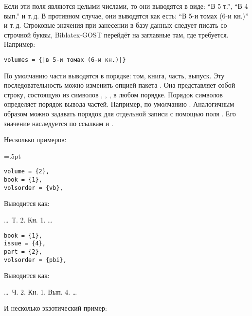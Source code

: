 \documentclass[10pt,a4paper,headings=small,numbers=enddot,english,russian]{ltxdockit}[2011/03/25]
\newcommand*{\biblatexgost}{Biblatex-GOST\xspace}
\newenvironment{bibexample}{\begin{list}
     {}
     {\setlength{\leftmargin}{\parindent}%
      \setlength{\itemindent}{-\leftmargin}%
      \setlength{\parsep}{0pt}}}
  {\end{list}}
\begin{document}
Если эти поля являются целыми числами, то они выводятся в виде: \enquote{В 5 т.},
\enquote{В 4 вып.} и т.\,д. В противном случае, они выводятся как есть: \enquote{В
5-и томах (6-и кн.)} и т.\,д. Строковые значения при занесении в базу данных следует
писать со строчной буквы, \biblatexgost перейдёт на заглавные там, где требуется. Например:

\begin{lstlisting}[style=bibtex,escapechar=|]
volumes = {|в 5-и томах (6-и кн.)|}
\end{lstlisting}

По умолчанию части выводятся в порядке: том, книга, часть, выпуск. Эту последовательность
можно изменить опцией пакета . Она представляет собой строку, состоящую из
символов , , ,  в любом порядке.   %
Порядок символов определяет порядок вывода частей. Например, по умолчанию .
Аналогичным образом можно задавать порядок для отдельной записи
с помощью поля . Его значение наследуется по ссылкам 
и .

Несколько примеров:

\columnseprule=.5pt
\raggedcolumns
\begin{multicols}{2}
\begin{lstlisting}[style=bibtex,escapechar=|]
volume = {2},
book = {1},
volsorder = {vb},
\end{lstlisting}
\columnbreak
Выводится как:
\begin{bibexample}
\item \ldots\ Т. 2. Кн. 1. \ldots
\end{bibexample}
\columnbreak
\end{multicols}

\bigskip

\begin{multicols}{2}
\begin{lstlisting}[style=bibtex,escapechar=|]
book = {1},
issue = {4},
part = {2},
volsorder = {pbi},
\end{lstlisting}
\columnbreak
Выводится как:
\begin{bibexample}
\item \ldots\ Ч. 2. Кн. 1. Вып. 4. \ldots
\end{bibexample}
\columnbreak
\end{multicols}

\bigskip
И несколько экзотический пример:
\bigskip
\end{document}
